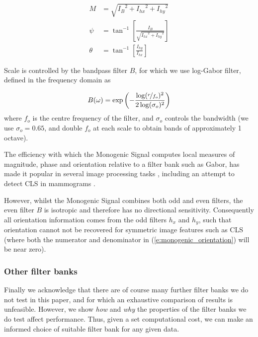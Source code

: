 \documentclass{IEEEtran}
\newcommand{\eref}[1]{(\ref{#1})}
\begin{document}
\begin{align}
M       &= \sqrt{{I_B}^2 + {I_{hx}}^2 + {I_{hy}}^2}
\label{e:monogenic_amplitude} \\
%
\psi	  &= \tan^{-1}\left[ \frac{I_B}{\sqrt{{I_{hx}}^2 + {I_{hy}}^2}} \right]
\label{e:monogenic_phase} \\
%
\theta  &= \tan^{-1}\left[ \frac{I_{hy}}{I_{hx}} \right]
\label{e:monogenic_orientation}
\end{align}

Scale is controlled by the bandpass filter $B$, for which we use log-Gabor filter, defined in the frequency domain as

\begin{equation}
B(\omega) = \exp \left( -\frac{ \log(\nicefrac{r}{f_o})^2 } {2 \log(\sigma_o)^2} \right)
\label{e:monogenic_bandpass}
\end{equation}
%
where $f_o$ is the centre frequency of the filter, and $\sigma_o$ controls the bandwidth (we use $\sigma_o=0.65$, and double $f_o$ at each scale to obtain bands of approximately 1 octave).

The efficiency with which the Monogenic Signal computes local measures of magnitude, phase and orientation relative to a filter bank such as Gabor, has made it popular in several image processing tasks \cite{}, including an attempt to detect CLS in mammograms \cite{wai}.

However, whilst the Monogenic Signal combines both odd and even filters, the even filter $B$ is isotropic and therefore has no directional sensitivity. Consequently all orientation information comes from the odd filters $h_x$ and $h_y$, such that orientation cannot not be recovered for symmetric image features such as CLS (where both the numerator and denominator in \eref{e:monogenic_orientation} will be near zero).

\subsubsection{Other filter banks}

\label{s:filtering_extras}
Finally we acknowledge that there are of course many further filter banks we do not test in this paper, and for which an exhaustive comparison of results is unfeasible. However, we show \emph{how} and \emph{why} the properties of the filter banks we do test affect performance. Thus, given a set computational cost, we can make an informed choice of suitable filter bank for any given data.
\end{document}
